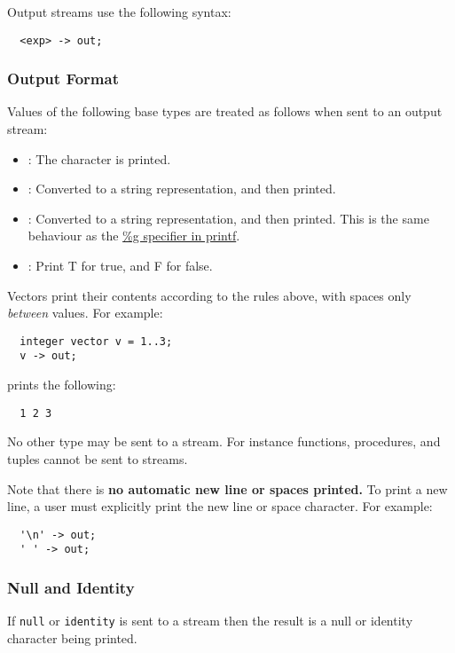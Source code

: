 \documentclass[streams.tex]{subfiles}
\begin{document}
Output streams use the following syntax:
\begin{lstlisting}
  <exp> -> out;
\end{lstlisting}

\subsubsection{Output Format}
\label{sssec:output_format}
Values of the following base types are treated as follows when sent to an output stream:
\begin{itemize}
  \item
    : The character is printed.
  \item
    : Converted to a string representation, and then printed.
  \item
    : Converted to a string representation, and then printed. This is the same behaviour
    as the \href{http://www.cplusplus.com/reference/cstdio/printf/	}{\%g specifier in printf}.
  \item
    : Print T for true, and F for false.
\end{itemize}

Vectors print their contents according to the rules above, with spaces only \textit{between} values.
For example:
\begin{lstlisting}
  integer vector v = 1..3;
  v -> out;
\end{lstlisting}

prints the following:
\begin{lstlisting}
  1 2 3
\end{lstlisting}

No other type may be sent to a stream. For instance functions, procedures, and tuples cannot be sent
to streams.

Note that there is \textbf{no automatic new line or spaces printed.} To print a new line, a user
must explicitly print the new line or space character. For example:
\begin{lstlisting}
  '\n' -> out;
  ' ' -> out;
\end{lstlisting}

\subsubsection{Null and Identity}
\label{sssec:stream_nai}
If \texttt{null} or \texttt{identity} is sent to a stream then the result is a null or identity
character being printed.
\end{document}
